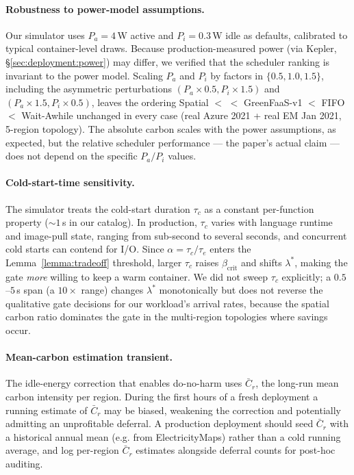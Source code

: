 \paragraph{Robustness to power-model assumptions.} Our simulator uses
$P_a = 4$\,W active and $P_i = 0.3$\,W idle as defaults, calibrated
to typical container-level draws. Because production-measured power
(via Kepler, \S\ref{sec:deployment:power}) may differ, we verified
that the scheduler ranking is invariant to the power model. Scaling
$P_a$ and $P_i$ by factors in $\{0.5, 1.0, 1.5\}$, including the
asymmetric perturbations $(P_a {\times} 0.5, P_i {\times} 1.5)$ and
$(P_a {\times} 1.5, P_i {\times} 0.5)$, leaves the ordering
Spatial $<$ \GreenFaaS{} $<$ GreenFaaS-v1 $<$ FIFO $<$ Wait-Awhile
unchanged in every case (real Azure 2021 + real EM Jan 2021, 5-region
topology). The absolute carbon scales with the power assumptions, as
expected, but the relative scheduler performance --- the paper's
actual claim --- does not depend on the specific $P_a/P_i$ values.

\paragraph{Cold-start-time sensitivity.} The simulator treats the
cold-start duration $\tau_c$ as a constant per-function property
($\sim 1$\,s in our catalog). In production, $\tau_c$ varies with
language runtime and image-pull state, ranging from sub-second to
several seconds, and concurrent cold starts can contend for I/O. Since
$\alpha = \tau_c/\tau_e$ enters the Lemma~\ref{lemma:tradeoff}
threshold, larger $\tau_c$ raises $\beta_{\mathrm{crit}}$ and shifts
$\lambda^*$, making the gate \emph{more} willing to keep a warm
container. We did not sweep $\tau_c$ explicitly; a $0.5$--$5$\,s span
(a $10\times$ range) changes $\lambda^*$ monotonically but does not
reverse the qualitative gate decisions for our workload's arrival
rates, because the spatial carbon ratio dominates the gate in the
multi-region topologies where savings occur.

\paragraph{Mean-carbon estimation transient.} The idle-energy
correction that enables do-no-harm uses $\bar{C}_r$, the long-run mean
carbon intensity per region. During the first hours of a fresh
deployment a running estimate of $\bar{C}_r$ may be biased, weakening
the correction and potentially admitting an unprofitable deferral. A
production deployment should seed $\bar{C}_r$ with a historical annual
mean (e.g. from ElectricityMaps) rather than a cold running average,
and log per-region $\bar{C}_r$ estimates alongside deferral counts for
post-hoc auditing.

